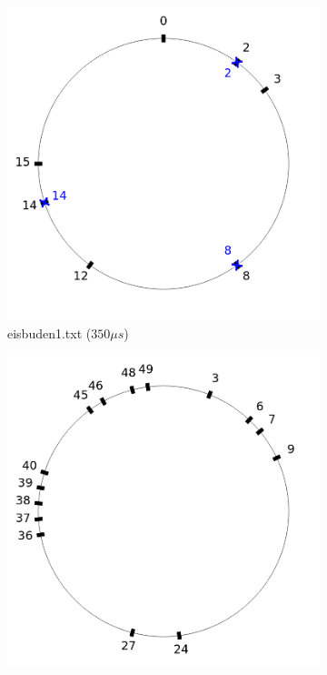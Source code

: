 \documentclass[a4paper,10pt,ngerman,captions=figureheading]{scrartcl}
\newcommand{\imageWidth}{0.3\linewidth}
\begin{document}
\begin{figure}[ht]
    \centering
    \setcounter{figure}{8}
    \caption{Beispiele vom BWINF}
    \label{fig:BWINF_Beispiele}
    \begin{subfigure}[t]{\imageWidth}
        \includegraphics[width=\linewidth]{eisbuden1.png}
        \caption{eisbuden1.txt ($350\mu s$)}
        \label{fig:eisbuden1}
    \end{subfigure}
    \begin{subfigure}[t]{\imageWidth}
        \includegraphics[width=\linewidth]{eisbuden2.png}

\end{subfigure}
\end{figure}
\end{document}
